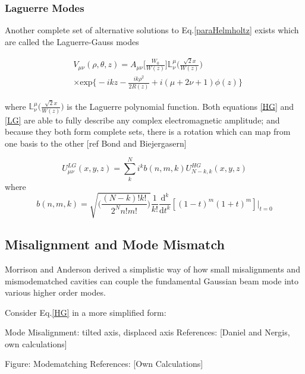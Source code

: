 \documentclass[oneside]{book}
\begin{document}
		\subsubsection{Laguerre Modes}
		Another complete set of alternative solutions to Eq.\ref{paraHelmholtz} exists which are called the Laguerre-Gauss modes
		
		\begin{equation}\label{LG}
		\begin{aligned}
		&V_{\mu\nu}(\rho,\theta,z) = A_{\mu\nu}\bigg[ \frac{W_0}{W(z)} \bigg] \mathbb{L}^{\mu}_{\nu} \Bigg( \frac{\sqrt{2}x}{W(z)}  \Bigg) \\
		&\times \text{exp} \bigg\{-ikz-\frac{ik\rho^2}{2R(z)} + i(\mu+2\nu+1)\phi(z) \bigg\}
		\end{aligned}
		\end{equation}
		
		where $\mathbb{L}^{\mu}_{\nu} \Bigg( \frac{\sqrt{2}x}{W(z)}  \Bigg)$ is the Laguerre polynomial function. Both equations \ref{HG} and \ref{LG} are able to fully describe any complex electromagnetic amplitude; and because they both form complete sets, there is a rotation which can map from one basis to the other [ref Bond and Biejergasern]
		
		\begin{equation}
		U^{LG}_{\mu \nu} (x,y,z) = \sum\limits_{k}^{N} i^k b(n,m,k) U^{HG}_{N-k,k} (x,y,z)
		\end{equation}
		where
		\begin{equation}
		b(n,m,k) = \sqrt{\bigg( \frac{(N-k)!k!}{2^N n!m!} \bigg)} \frac{1}{k!} \frac{\text{d}^k}{\text{d}t^k}[(1-t)^m (1+t)^m]\vert_{t=0}
		\end{equation}

		\subsection{Misalignment and Mode Mismatch}\label{Misalignment}
		Morrison and Anderson derived a simplistic way of how small misalignments and mismodematched cavities can couple the fundamental Gaussian beam mode into various higher order modes.
		
		Consider Eq.\ref{HG} in a more simplified form:
		
		
		
		
		Mode Misalignment: tilted axis, displaced axis
		References: [Daniel and Nergis, own calculations]
			
		
		
		Figure: Modematching
			References: [Own Calculations]
				
\end{document}
